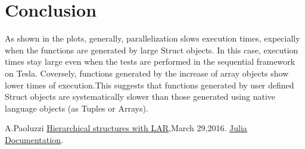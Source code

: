 \documentclass[a4paper,12pt]{article}
\begin{document}
\newpage

\section{Conclusion}

As shown in the plots, generally, parallelization slows execution times, expecially when the functions are generated by large Struct objects.
In this case, execution times stay large even when the tests are performed in the sequential framework on Tesla. Coversely, functions generated by the increase of 
array objects show lower times of execution.This suggests that functions generated by user defined Struct objects are systematically slower than those generated using 
native language objects (as Tuples or Arrays).




\begin{thebibliography}{9}
 A.Paoluzzi
\href{https://github.com/cvdlab/lar-cc/blob/master/doc/pdf/larstruct.pdf}{Hierarchical structures with LAR},March 29,2016.
\href{https://docs.julialang.org/en/release-0.6/}{Julia Documentation}.
\end{thebibliography}
\end{document}
